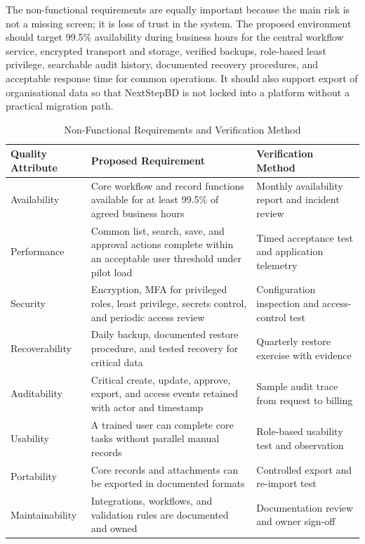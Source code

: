 \documentclass[12pt,a4paper]{report}
\begin{document}
The non-functional requirements are equally important because the main risk is not a missing screen;
it is loss of trust in the system. The proposed environment should target 99.5\% availability during
business hours for the central workflow service, encrypted transport and storage, verified backups,
role-based least privilege, searchable audit history, documented recovery procedures, and acceptable
response time for common operations. It should also support export of organisational data so that
NextStepBD is not locked into a platform without a practical migration path.

\begin{table}[H]
\centering
\caption{Non-Functional Requirements and Verification Method}
\label{tab:nonfunctional-requirements}
\small
\renewcommand{\arraystretch}{1.18}
\begin{tabularx}{\textwidth}{>{\raggedright\arraybackslash}p{2.5cm}
                                >{\raggedright\arraybackslash}X
                                >{\raggedright\arraybackslash}p{3.6cm}}
\toprule
\textbf{Quality Attribute} & \textbf{Proposed Requirement} & \textbf{Verification Method} \\
\midrule
Availability & Core workflow and record functions available for at least 99.5\% of agreed business hours & Monthly availability report and incident review \\
Performance & Common list, search, save, and approval actions complete within an acceptable user threshold under pilot load & Timed acceptance test and application telemetry \\
Security & Encryption, MFA for privileged roles, least privilege, secrets control, and periodic access review & Configuration inspection and access-control test \\
Recoverability & Daily backup, documented restore procedure, and tested recovery for critical data & Quarterly restore exercise with evidence \\
Auditability & Critical create, update, approve, export, and access events retained with actor and timestamp & Sample audit trace from request to billing \\
Usability & A trained user can complete core tasks without parallel manual records & Role-based usability test and observation \\
Portability & Core records and attachments can be exported in documented formats & Controlled export and re-import test \\
Maintainability & Integrations, workflows, and validation rules are documented and owned & Documentation review and owner sign-off \\
\bottomrule
\end{tabularx}
\end{table}
\end{document}
